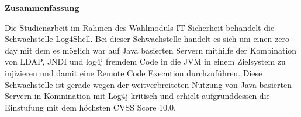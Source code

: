 
\textbf{\large Zusammenfassung}
\begin{justify}
Die Studienarbeit im Rahmen des Wahlmoduls IT-Sicherheit behandelt die Schwachstelle Log4Shell.
Bei dieser Schwachstelle handelt es sich um einen zero-day mit dem es möglich war auf Java basierten
Servern mithilfe der Kombination von LDAP, JNDI und log4j fremdem Code in die JVM in einem Zielsystem zu
injizieren und damit eine Remote Code Execution durchzuführen. Diese Schwachstelle ist gerade wegen der weitverbreiteten
Nutzung von Java basierten Servern in Komnination mit Log4j kritisch und erhielt aufgrunddessen die Einstufung
mit dem höchsten CVSS Score 10.0.
\end{justify}


